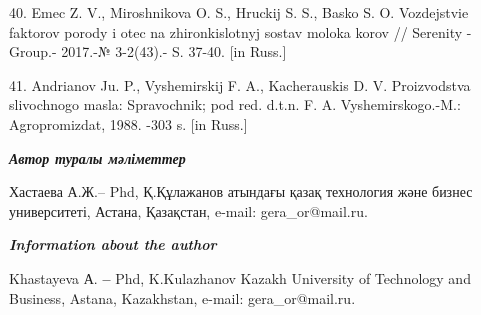 40. Emec Z. V., Miroshnikova O. S., Hruckij S. S., Basko S. O.
Vozdejstvie faktorov porody i otec na zhironkislotnyj sostav moloka
korov // Serenity -Group.- 2017.-№ 3-2(43).- S. 37-40. {[}in Russ.{]}

41. Andrianov Ju. P., Vyshemirskij F. A., Kacherauskis D. V.
Proizvodstva slivochnogo masla: Spravochnik; pod red. d.t.n. F. A.
Vyshemirskogo.-M.: Agropromizdat, 1988. -303 s. {[}in Russ.{]}

\emph{{\bfseries Автор туралы мәліметтер}}

Хастаева А.Ж.-- Phd, Қ.Құлажанов атындағы қазақ технология және бизнес
университеті, Астана, Қазақстан, e-mail: gera\_or@mail.ru.

\emph{{\bfseries Information about the author}}

Khastayeva А. {\bfseries --} Phd, K.Kulazhanov Kazakh University of
Technology and Business, Astana, Kazakhstan, e-mail: gera\_or@mail.ru.





